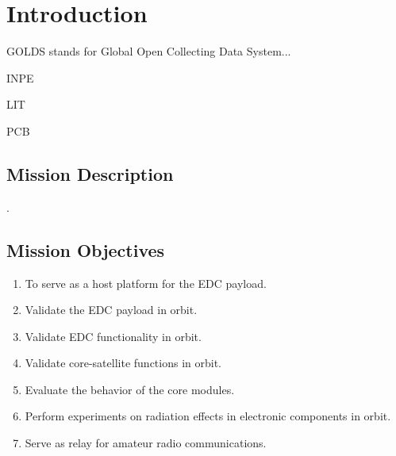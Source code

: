 %
%
%
%
%

%
%
%
%
%
%

\chapter{Introduction} \label{ch:introduction}

GOLDS stands for Global Open Collecting Data System...

INPE

LIT

PCB

\section{Mission Description}

.

\section{Mission Objectives}

\begin{enumerate}
    \item To serve as a host platform for the EDC payload.
    \item Validate the EDC payload in orbit.
    \item Validate EDC functionality in orbit.
    \item Validate core-satellite functions in orbit.
    \item Evaluate the behavior of the core modules.
    \item Perform experiments on radiation effects in electronic components in orbit.
    \item Serve as relay for amateur radio communications.
\end{enumerate}

